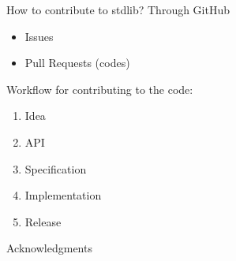 \documentclass{beamer}
\begin{document}
\begin{frame}[c]{How to contribute to stdlib?}
	Through GitHub
	\begin{itemize}
		\item Issues
		\item Pull Requests (codes)
	\end{itemize}

	Workflow for contributing to the code:
	\begin{enumerate}
		\item Idea
		\item API
		\item Specification
		\item Implementation
		\item Release
	\end{enumerate}
\end{frame}

\begin{frame}[c]{Acknowledgments}
	
\end{frame}
\end{document}
